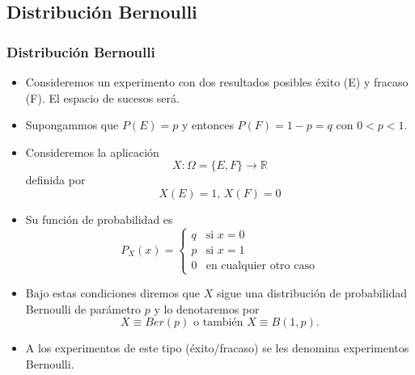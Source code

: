 \documentclass[handout]{beamer}\usepackage[]{graphicx}\usepackage[]{color}
\newcommand{\RR}{\mathbb{R}}
\renewcommand{\leq}{\leqslant}
\theoremstyle{plain}
\theoremstyle{definition}
\begin{document}
\subsection{Distribución Bernoulli}
\begin{frame}
\frametitle{Distribución Bernoulli}
\begin{itemize}
\item Consideremos un experimento con dos resultados posibles éxito (E) y
fracaso (F). El espacio de sucesos será.
\item Supongammos  que  $P(E)=p$ y entonces $P(F)=1-p=q$ con $0<p<1$.
\item Consideremos la  aplicación 
$$X:\Omega=\{E,F\}\to \RR$$
definida por
$$X(E)=1\mbox{, }X(F)=0$$
\item Su  función de probabilidad es
$$
P_{X}(x)=
\left\{
\begin{array}{ll} q & \mbox{si } x=0\\
p & \mbox{si } x=1\\
0 & \mbox{en cualquier otro caso}
\end{array}
\right.
$$
\end{itemize}
\end{frame}


\begin{frame}[fragile]
\begin{itemize}
\item Bajo estas condiciones diremos que $X$ sigue una distribución de
probabilidad  Bernoulli de parámetro $p$ y lo denotaremos por
$$X\equiv Ber(p)\mbox{ o también } X\equiv B(1,p).$$
\item A los experimentos de este tipo (éxito/fracaso)
    se les denomina experimentos Bernoulli.
\end{itemize}
\end{frame}
% 
% 
% 
\end{document}

